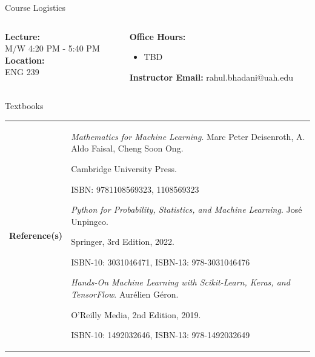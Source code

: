 \documentclass[aspectratio=169,xcolor=dvipsnames,svgnames,x11names,fleqn]{beamer}
\begin{document}

\begin{frame}{Course Logistics
}
  \begin{columns}[T] %
    \begin{column}{0.5\textwidth}
      \textbf{Lecture:} \\
      M/W 4:20 PM - 5:40 PM \\
      \vspace{0.3cm}
      \textbf{Location:} \\
      ENG 239 \\
      
    \end{column}
    \begin{column}{0.5\textwidth}
      \textbf{Office Hours:}
      \begin{itemize}
        \item TBD
      \end{itemize}
      \textbf{Instructor Email:} rahul.bhadani@uah.edu
    \end{column}
  \end{columns}
\end{frame}

\begin{frame}{Textbooks}
\begin{tabular}{p{}p{}}

\textbf{Reference(s)} 
        & \emph{\color{DarkGreen}Mathematics for Machine Learning}. Marc Peter Deisenroth, A. Aldo Faisal, Cheng Soon Ong. \par{\color{DarkRed}Cambridge University Press}. \par ISBN: 9781108569323, 1108569323\par\vspace{5pt}

		\emph{\color{DarkGreen}Python for Probability, Statistics, and Machine Learning}. José Unpingco. \par{\color{DarkRed}Springer, 3rd Edition, 2022}. \par ISBN-10: 3031046471, ISBN-13: 978-3031046476\par\vspace{5pt}

        \emph{\color{DarkGreen}Hands-On Machine Learning with Scikit-Learn, Keras, and TensorFlow}. Aurélien Géron. \par{\color{DarkRed} O'Reilly Media, 2nd Edition, 2019}. \par ISBN-10: 1492032646, ISBN-13: 978-1492032649\par

\end{tabular}

\end{frame}
\end{document}

